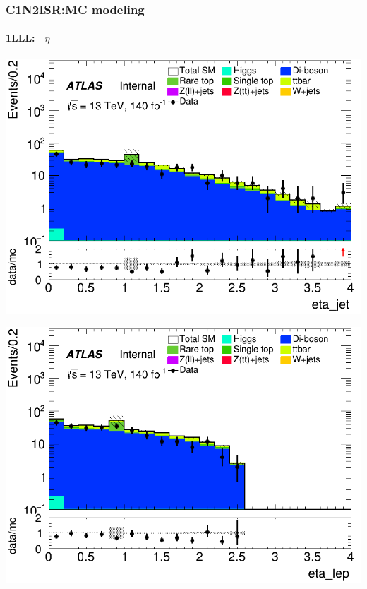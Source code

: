 \documentclass[usenames,dvipsnames]{beamer}
\begin{document}
\begin{frame}
\frametitle{C1N2ISR:MC modeling}
\framesubtitle{1LLL:$\quad\eta$}
    \begin{minipage}{0.32\textwidth}
        \centering
        \includegraphics[width=\textwidth]{graphics/LLL_met/LLL_met_eta_jet.png}
    \end{minipage}
    \hfill
    \begin{minipage}{0.32\textwidth}
        \centering
        \includegraphics[width=\textwidth]{graphics/LLL_met/LLL_met_eta_lep.png}
    \end{minipage}
    \hfill
    \begin{minipage}{0.32\textwidth}
        \centering

\end{minipage}
\end{frame}
\end{document}
